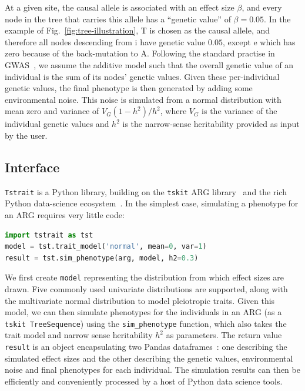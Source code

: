\documentclass[unnumsec,webpdf,modern,large,namedate]{oup-authoring-template}%
\begin{document}
At a given site, the causal allele is associated with an
effect size $\beta$,
and every node in the tree that carries this allele has a
``genetic value'' of $\beta=0.05$. In the example of
Fig.~\ref{fig:tree-illustration}, T is chosen as the causal
allele, and therefore all nodes descending from \textsf{i}
have genetic value $0.05$, except \textsf{e} which
has zero because of the back-mutation to A.
Following the standard practise in GWAS~\citep{uffelmann2021},
we assume the additive model such that the overall
genetic value of an individual is the sum of its
nodes' genetic values.
Given these per-individual genetic values, the final phenotype
is then generated by adding some environmental noise.
This noise is simulated from a normal distribution with mean zero
and variance of $V_G(1-h^2)/{h^2}$,
where $V_G$ is the variance of the individual genetic values
and $h^2$ is the narrow-sense heritability provided as input by the user.

\subsection{Interface}
\texttt{Tstrait} is a Python library, building on the \texttt{tskit}
ARG library~\citep{ralph2020,wong2023general} and the rich
Python data-science ecosystem~\citep{numpy}.
In the simplest case, simulating a phenotype for an ARG requires
very little code:
\begin{lstlisting}[language=Python]
import tstrait as tst
model = tst.trait_model('normal', mean=0, var=1)
result = tst.sim_phenotype(arg, model, h2=0.3)
\end{lstlisting}
We first create \texttt{model} representing the distribution
from which effect sizes are drawn. Five commonly used
univariate distributions are supported, along with the
multivariate normal distribution to model pleiotropic traits.
Given this model, we can then simulate phenotypes for the individuals
in an ARG (as a  \texttt{tskit TreeSequence}) using the
\texttt{sim\_phenotype} function, which also takes the trait model
and narrow sense heritability $h^2$ as parameters.
The return value \texttt{result} is an object encapsulating
two Pandas dataframes~\citep{mckinney2010data}: one describing the simulated
effect sizes and the other describing the genetic values,
environmental noise and final phenotypes for each individual.
The simulation results can then be efficiently and conveniently
processed by a host of Python data science tools.
\end{document}
